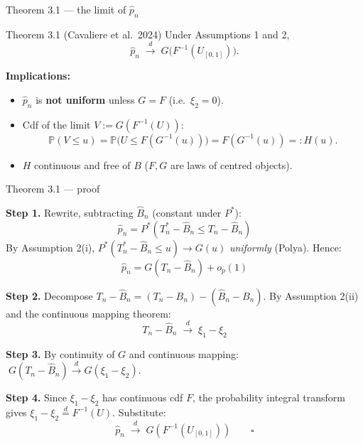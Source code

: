 \documentclass[10pt,aspectratio=169]{beamer}
\theoremstyle{plain}
\newcommand{\PR}{\mathbb{P}}
\newcommand{\Pstar}{P^{*}}
\newcommand{\dto}{\xrightarrow{d}}
\newcommand{\Tn}{T_{n}}
\newcommand{\Tns}{T_{n}^{*}}
\newcommand{\Bn}{B_{n}}
\newcommand{\Bnh}{\hat{B}_{n}}
\newcommand{\pnh}{\hat{p}_{n}}
\begin{document}

\begin{frame}{Theorem 3.1 --- the limit of $\pnh$}

  \begin{block}{Theorem 3.1 (Cavaliere et al.\ 2024)}
    Under Assumptions 1 and 2,
    \[
      \pnh \;\dto\; G\bigl(F^{-1}(U_{[0,1]})\bigr).
    \]
  \end{block}

  \bigskip

  \textbf{Implications:}
  \begin{itemize}
    \setlength{\itemsep}{6pt}
    \item $\pnh$ is \textbf{not uniform} unless $G = F$ (i.e.\ $\xi_2 = 0$).
    \item Cdf of the limit $V := G(F^{-1}(U))$:
      \[
        \PR(V\le u) = \PR\!\bigl(U \le F(G^{-1}(u))\bigr) = F(G^{-1}(u)) =: H(u).
      \]
    \item $H$ continuous and \alert{free of $B$} ($F,G$ are laws of centred objects).
  \end{itemize}

\end{frame}


\begin{frame}{Theorem 3.1 --- proof}

  \textbf{Step 1.} Rewrite, subtracting $\Bnh$ (constant under $\Pstar$):
  \[
    \pnh = \Pstar(\Tns - \Bnh \le \Tn - \Bnh)
  \]
  By Assumption 2(i), $\Pstar(\Tns - \Bnh \le u) \to G(u)$ \textit{uniformly} (Polya). Hence:
  \[
    \pnh = G(\Tn - \Bnh) + o_p(1)
  \]

  \textbf{Step 2.} Decompose $\Tn - \Bnh = (\Tn - \Bn) - (\Bnh - \Bn)$.
  By Assumption 2(ii) and the continuous mapping theorem:
  \[
    \Tn - \Bnh \;\dto\; \xi_1 - \xi_2
  \]

  \textbf{Step 3.} By continuity of $G$ and continuous mapping:
  $\;G(\Tn - \Bnh) \dto G(\xi_1 - \xi_2)$.

  \medskip

  \textbf{Step 4.} Since $\xi_1 - \xi_2$ has continuous cdf $F$, the probability integral transform
  gives $\xi_1 - \xi_2 \overset{d}{=} F^{-1}(U)$. Substitute:
  \[
    \pnh \;\dto\; G(F^{-1}(U_{[0,1]})) \qquad\square
  \]

\end{frame}
\end{document}
